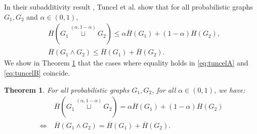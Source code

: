 \documentclass[conference,a4paper]{IEEEtran}
\newtheorem{theorem}{Theorem}[section]
\begin{document}

In their subadditivity result \cite[Theorem 2]{tuncel2009complementary}, Tuncel et al. show that for all probabilistic graphs $G_1,G_2$ and $\alpha \in (0,1)$,
\begin{align}
    & \overline{H}(G_1 \overset{(\alpha, 1-\alpha)}{\sqcup} G_2) \leq \alpha \overline{H}(G_1) + (1-\alpha)\overline{H}(G_2), \label{eq:tuncelA}\\
    & \overline{H}(G_1 \wedge G_2) \leq \overline{H}(G_1) + \overline{H}(G_2).\label{eq:tuncelB}
   \end{align}
We show in Theorem \ref{th:caraclinspec} that the cases where equality holds in \eqref{eq:tuncelA} and \eqref{eq:tuncelB} coincide. 

\begin{theorem}\label{th:caraclinspec}
    For all probabilistic graphs $G_1, G_2$, for all $\alpha \in (0,1)$, we have:
    \begin{align}
        & \overline{H}(G_1 \overset{(\alpha, 1-\alpha)}{\sqcup} G_2) = \alpha \overline{H}(G_1) + (1-\alpha)\overline{H}(G_2) \\
        \Longleftrightarrow\: & \overline{H}(G_1 \wedge G_2) = \overline{H}(G_1) + \overline{H}(G_2).
    \end{align}
\end{theorem}
\end{document}

